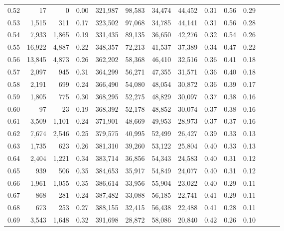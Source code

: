 \begin{tabular}{rrrrrrrrrrrrrr}
0.52 &      17 &      0 &  0.00 &  321,987 &   98,583 &  34,474 &  44,452 &  0.31 &  0.56 &      0.29 \\
0.53 &   1,515 &    311 &  0.17 &  323,502 &   97,068 &  34,785 &  44,141 &  0.31 &  0.56 &      0.28 \\
0.54 &   7,933 &  1,865 &  0.19 &  331,435 &   89,135 &  36,650 &  42,276 &  0.32 &  0.54 &      0.26 \\
0.55 &  16,922 &  4,887 &  0.22 &  348,357 &   72,213 &  41,537 &  37,389 &  0.34 &  0.47 &      0.22 \\
0.56 &  13,845 &  4,873 &  0.26 &  362,202 &   58,368 &  46,410 &  32,516 &  0.36 &  0.41 &      0.18 \\
0.57 &   2,097 &    945 &  0.31 &  364,299 &   56,271 &  47,355 &  31,571 &  0.36 &  0.40 &      0.18 \\
0.58 &   2,191 &    699 &  0.24 &  366,490 &   54,080 &  48,054 &  30,872 &  0.36 &  0.39 &      0.17 \\
0.59 &   1,805 &    775 &  0.30 &  368,295 &   52,275 &  48,829 &  30,097 &  0.37 &  0.38 &      0.16 \\
0.60 &      97 &     23 &  0.19 &  368,392 &   52,178 &  48,852 &  30,074 &  0.37 &  0.38 &      0.16 \\
0.61 &   3,509 &  1,101 &  0.24 &  371,901 &   48,669 &  49,953 &  28,973 &  0.37 &  0.37 &      0.16 \\
0.62 &   7,674 &  2,546 &  0.25 &  379,575 &   40,995 &  52,499 &  26,427 &  0.39 &  0.33 &      0.13 \\
0.63 &   1,735 &    623 &  0.26 &  381,310 &   39,260 &  53,122 &  25,804 &  0.40 &  0.33 &      0.13 \\
0.64 &   2,404 &  1,221 &  0.34 &  383,714 &   36,856 &  54,343 &  24,583 &  0.40 &  0.31 &      0.12 \\
0.65 &     939 &    506 &  0.35 &  384,653 &   35,917 &  54,849 &  24,077 &  0.40 &  0.31 &      0.12 \\
0.66 &   1,961 &  1,055 &  0.35 &  386,614 &   33,956 &  55,904 &  23,022 &  0.40 &  0.29 &      0.11 \\
0.67 &     868 &    281 &  0.24 &  387,482 &   33,088 &  56,185 &  22,741 &  0.41 &  0.29 &      0.11 \\
0.68 &     673 &    253 &  0.27 &  388,155 &   32,415 &  56,438 &  22,488 &  0.41 &  0.28 &      0.11 \\
0.69 &   3,543 &  1,648 &  0.32 &  391,698 &   28,872 &  58,086 &  20,840 &  0.42 &  0.26 &      0.10 \\

\end{tabular}
